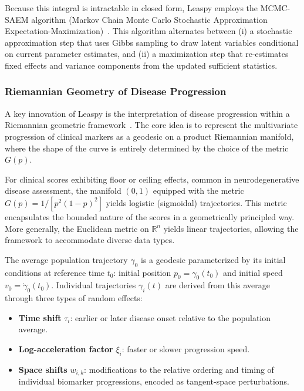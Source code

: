 \documentclass{rapportCS}
\begin{document}
Because this integral is intractable in closed form, Leaspy employs the MCMC-SAEM algorithm (Markov Chain Monte Carlo Stochastic Approximation Expectation-Maximization)~\cite{kuhn2005maximum}. This algorithm alternates between (i) a stochastic approximation step that uses Gibbs sampling to draw latent variables conditional on current parameter estimates, and (ii) a maximization step that re-estimates fixed effects and variance components from the updated sufficient statistics.

\subsubsection{Riemannian Geometry of Disease Progression}

A key innovation of Leaspy is the interpretation of disease progression within a Riemannian geometric framework~\cite{schiratti2017bayesian}. The core idea is to represent the multivariate progression of clinical markers as a geodesic on a product Riemannian manifold, where the shape of the curve is entirely determined by the choice of the metric $G(p)$. 

For clinical scores exhibiting floor or ceiling effects, common in neurodegenerative disease assessment, the manifold $(0,1)$ equipped with the metric $G(p) = 1/[p^2(1-p)^2]$ yields logistic (sigmoidal) trajectories. This metric encapsulates the bounded nature of the scores in a geometrically principled way. More generally, the Euclidean metric on $\mathbb{R}^n$ yields linear trajectories, allowing the framework to accommodate diverse data types.

The average population trajectory $\gamma_0$ is a geodesic parameterized by its initial conditions at reference time $t_0$: initial position $p_0 = \gamma_0(t_0)$ and initial speed $v_0 = \dot{\gamma}_0(t_0)$. Individual trajectories $\gamma_i(t)$ are derived from this average through three types of random effects:

\begin{itemize}
  \item \textbf{Time shift} $\tau_i$: earlier or later disease onset relative to the population average.
  \item \textbf{Log-acceleration factor} $\xi_i$: faster or slower progression speed.
  \item \textbf{Space shifts} $w_{i,k}$: modifications to the relative ordering and timing of individual biomarker progressions, encoded as tangent-space perturbations.
\end{itemize}
\end{document}
